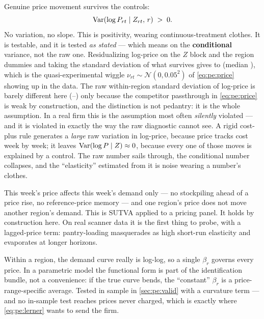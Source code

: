 \begin{assumption}\label{as:pe:variation}
Genuine price movement survives the controls:
%
\[
  \operatorname{Var}(\log P_{rt} \mid Z_{rt},\, r) \;>\; 0 .
\]
%
No variation, no slope. This is positivity, wearing continuous-treatment clothes. It is testable,
and it is tested \emph{as stated} --- which means on the \textbf{conditional} variance, not the raw
one. Residualizing log-price on the $Z$ block and the region dummies and taking the standard
deviation of what survives gives \nbThreeLpResidSdMin{} to \nbThreeLpResidSdMax{} (median
\nbThreeLpResidSdMed), which is the quasi-experimental wiggle
$\nu_{rt} \sim \mathcal N(0, 0.05^2)$ of \cref{eq:pe:price} showing up in the data. The raw
within-region standard deviation of log-price is barely different here
(\nbThreeLpSdMin{}--\nbThreeLpSdMax) only because the competitor passthrough in
\cref{eq:pe:price} is weak by construction, and the distinction is not pedantry: it is the whole
assumption. In a real firm this is the assumption most often \emph{silently} violated --- and it is
violated in exactly the way the raw diagnostic cannot see. A rigid cost-plus rule generates a
\emph{large} raw variation in log-price, because price tracks cost week by week; it leaves
$\operatorname{Var}(\log P \mid Z) \approx 0$, because every one of those moves is explained by a control. The
raw number sails through, the conditional number collapses, and the ``elasticity'' estimated from
it is noise wearing a number's clothes.
\end{assumption}

\begin{assumption}\label{as:pe:sutva}
This week's price affects this week's demand only --- no stockpiling ahead of a price rise, no
reference-price memory --- and one region's price does not move another region's demand. This is
SUTVA \citep{imbens2015} applied to a pricing panel. It holds by construction here. On real scanner
data it is the first thing to probe, with a lagged-price term: pantry-loading masquerades as high
short-run elasticity and evaporates at longer horizons.
\end{assumption}

\begin{assumption}\label{as:pe:form}
Within a region, the demand curve really is log-log, so a single $\beta_r$ governs every price. In
a parametric model the functional form is part of the identification bundle, not a convenience: if
the true curve bends, the ``constant'' $\beta_r$ is a price-range-specific average. Tested in
sample in \cref{sec:pe:valid} with a curvature term --- and no in-sample test reaches prices never
charged, which is exactly where \cref{eq:pe:lerner} wants to send the firm.
\end{assumption}


